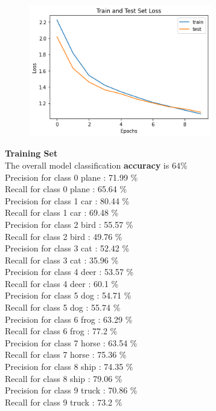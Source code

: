 \documentclass[submit]{harvardml}
\begin{document}
\begin{enumerate}
    \begin{figure}[H]
        \includegraphics[width=8cm]{hw3/loss_plot3.7.png}
        \centering
    \end{figure}
    
    \textbf{Training Set} \\
    The overall model classification \textbf{accuracy} is $64\%$\\
    Precision for class 0 plane : 71.99 \% \\
    Recall for class 0 plane : 65.64 \% \\
    Precision for class 1 car : 80.44 \% \\
    Recall for class 1 car : 69.48 \% \\
    Precision for class 2 bird : 55.57 \% \\
    Recall for class 2 bird : 49.76 \% \\
    Precision for class 3 cat : 52.42 \% \\
    Recall for class 3 cat : 35.96 \% \\
    Precision for class 4 deer : 53.57 \% \\
    Recall for class 4 deer : 60.1 \% \\
    Precision for class 5 dog : 54.71 \% \\
    Recall for class 5 dog : 55.74 \% \\
    Precision for class 6 frog : 63.29 \% \\
    Recall for class 6 frog : 77.2 \% \\
    Precision for class 7 horse : 63.54 \% \\
    Recall for class 7 horse : 75.36 \% \\
    Precision for class 8 ship : 74.35 \% \\
    Recall for class 8 ship : 79.06 \% \\
    Precision for class 9 truck : 70.86 \% \\
    Recall for class 9 truck : 73.2 \% \\


\end{enumerate}
\end{document}
